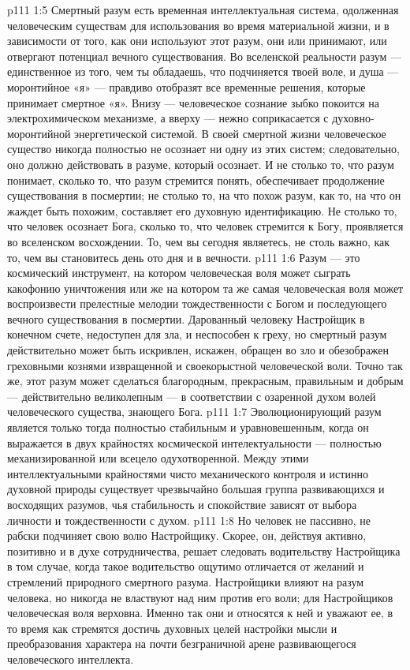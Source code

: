 \vs p111 1:5 Смертный разум есть временная интеллектуальная система, одолженная человеческим существам для использования во время материальной жизни, и в зависимости от того, как они используют этот разум, они или принимают, или отвергают потенциал вечного существования. Во вселенской реальности разум --- единственное из того, чем ты обладаешь, что подчиняется твоей воле, и душа --- моронтийное «я» --- правдиво отобразят все временные решения, которые принимает смертное «я». Внизу --- человеческое сознание зыбко покоится на электрохимическом механизме, а вверху --- нежно соприкасается с духовно\hyp{}моронтийной энергетической системой. В своей смертной жизни человеческое существо никогда полностью не осознает ни одну из этих систем; следовательно, оно должно действовать в разуме, который осознает. И не столько то, что разум понимает, сколько то, что разум стремится понять, обеспечивает продолжение существования в посмертии; не столько то, на что похож разум, как то, на что он жаждет быть похожим, составляет его духовную идентификацию. Не столько то, что человек осознает Бога, сколько то, что человек стремится к Богу, проявляется во вселенском восхождении. То, чем вы сегодня являетесь, не столь важно, как то, чем вы становитесь день ото дня и в вечности.
\vs p111 1:6 Разум --- это космический инструмент, на котором человеческая воля может сыграть какофонию уничтожения или же на котором та же самая человеческая воля может воспроизвести прелестные мелодии тождественности с Богом и последующего вечного существования в посмертии. Дарованный человеку Настройщик в конечном счете, недоступен для зла, и неспособен к греху, но смертный разум действительно может быть искривлен, искажен, обращен во зло и обезображен греховными кознями извращенной и своекорыстной человеческой воли. Точно так же, этот разум может сделаться благородным, прекрасным, правильным и добрым --- действительно великолепным --- в соответствии с озаренной духом волей человеческого существа, знающего Бога.
\vs p111 1:7 \pc Эволюционирующий разум является только тогда полностью стабильным и уравновешенным, когда он выражается в двух крайностях космической интелектуальности --- полностью механизированной или всецело одухотворенной. Между этими интеллектуальными крайностями чисто механического контроля и истинно духовной природы существует чрезвычайно большая группа развивающихся и восходящих разумов, чья стабильность и спокойствие зависят от выбора личности и тождественности с духом.
\vs p111 1:8 Но человек не пассивно, не рабски подчиняет свою волю Настройщику. Скорее, он, действуя активно, позитивно и в духе сотрудничества, решает следовать водительству Настройщика в том случае, когда такое водительство ощутимо отличается от желаний и стремлений природного смертного разума. Настройщики влияют на разум человека, но никогда не властвуют над ним против его воли; для Настройщиков человеческая воля верховна. Именно так они и относятся к ней и уважают ее, в то время как стремятся достичь духовных целей настройки мысли и преобразования характера на почти безграничной арене развивающегося человеческого интеллекта.

